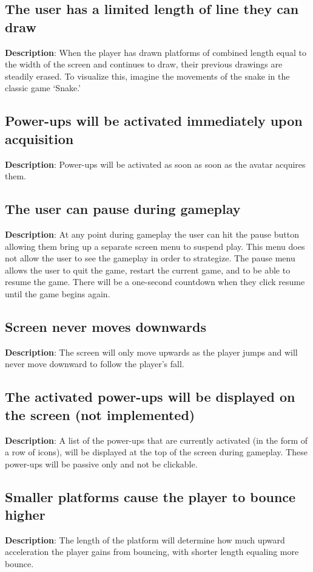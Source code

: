 \subsection{The user has a limited length of line they can draw}
\textbf{Description}: When the player has drawn platforms of combined
length equal to the width of the screen and continues to draw, their previous
drawings are steadily erased. To visualize this, imagine the movements
of the snake in the classic game \textquoteleft{}Snake.\textquoteright{}

\subsection{Power-ups will be activated immediately upon acquisition }
\textbf{Description}: Power-ups will be activated as soon as soon
as the avatar acquires them.

\subsection{The user can pause during gameplay}
\textbf{Description}: At any point during gameplay the user can hit
the pause button allowing them bring up a separate screen menu to
suspend play. This menu does not allow the user to see the gameplay
in order to strategize. The pause menu allows the user to quit the
game, restart the current game, and to be able to resume the game. 
There will be a one-second countdown when they click resume until 
the game begins again.

\subsection{Screen never moves downwards}
\textbf{Description}: The screen will only move upwards as the player
jumps and will never move downward to follow the player\textquoteright{}s
fall.

\subsection{The activated power-ups will be displayed on the screen (not implemented)}
\textbf{Description}: A list of the power-ups that are currently activated
(in the form of a row of icons), will be displayed at the top of the
screen during gameplay. These power-ups will be passive only and not
be clickable.

\subsection{Smaller platforms cause the player to bounce higher}
\label{GAME-12}
\textbf{Description}: The length of the platform will determine how
much upward acceleration the player gains from bouncing, with shorter
length equaling more bounce.

